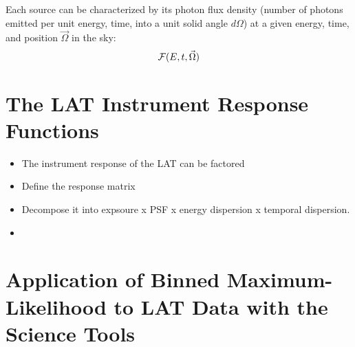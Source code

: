 Each source can be characterized by its photon flux density (number
of photons emitted per unit energy, time, into a unit solid angle $d\Omega$)
at a given energy, time, and position $\vec\Omega$ in the sky:
\begin{equation}
  \mathcal{F}(E,t,\vec\Omega)
\end{equation}

\section{The LAT Instrument Response Functions}

\begin{itemize}
  \item The instrument response of the LAT can be factored
  \item Define the response matrix
  \item Decompose it into expsoure x PSF x energy dispersion x temporal dispersion.
  \item
\end{itemize}

\section{Application of Binned Maximum-Likelihood to LAT Data with the Science Tools}


